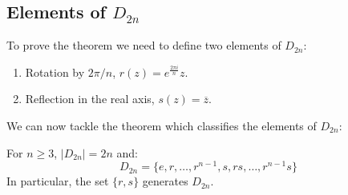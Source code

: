 \documentclass[../main.tex]{subfiles}
\begin{document}
\subsection{Elements of \texorpdfstring{$D_{2n}$}{Dihedral Groups}}
To prove the theorem we need to define two elements of $D_{2n}$:
\begin{enumerate}
 \item Rotation by $2\pi/n$, $r(z) = e^{\frac{2\pi i}{n}}z$.
 \item Reflection in the real axis, $s(z) = \overline{z}$.
\end{enumerate}
We can now tackle the theorem which classifies the elements of $D_{2n}$:
\begin{theorem}
  For $n \geq 3$, $|D_{2n}| = 2n$ and:
  \[
    D_{2n} = \{e, r, \ldots, r^{n-1}, s, rs, \ldots, r^{n-1}s\}
  \]
  In particular, the set $\{r, s\}$ generates $D_{2n}$.
\end{theorem}
\end{document}
